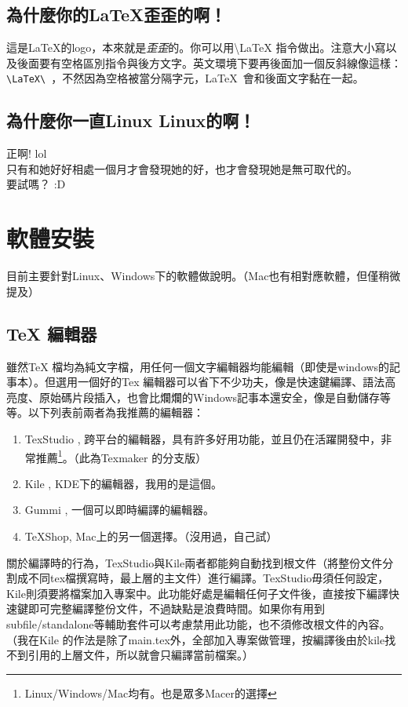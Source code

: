 \documentclass[class=NCU_thesis, crop=false, float=true]{standalone}
\begin{document}
\section{為什麼你的\LaTeX 歪歪的啊！}
這是\LaTeX 的logo，本來就是\textit{歪歪}的。你可以用\textbackslash{}LaTeX 指令做出。注意大小寫以及後面要有空格區別指令與後方文字。英文環境下要再後面加一個反斜線像這樣：\verb*|\LaTeX\ |，不然因為空格被當分隔字元，\LaTeX\ 會和後面文字黏在一起。

\section{為什麼你一直Linux Linux的啊！}
正啊! lol \\
只有和她好好相處一個月才會發現她的好，也才會發現她是無可取代的。 \\

\noindent 要試嗎？ :D



\chapter{軟體安裝}
\label{sec:c_install}
目前主要針對Linux、Windows下的軟體做說明。（Mac也有相對應軟體，但僅稍微提及）
\section{TeX 編輯器}
雖然TeX 檔均為純文字檔，用任何一個文字編輯器均能編輯（即使是windows的記事本）。但選用一個好的Tex 編輯器可以省下不少功夫，像是快速鍵編譯、語法高亮度、原始碼片段插入，也會比爛爛的Windows記事本還安全，像是自動儲存等等。以下列表前兩者為我推薦的編輯器：
\begin{enumerate}
    \item TexStudio , 跨平台的編輯器，具有許多好用功能，並且仍在活躍開發中，非常推薦\footnote{Linux/Windows/Mac均有。也是眾多Macer的選擇}。（此為Texmaker 的分支版）
    \item Kile , KDE下的編輯器，我用的是這個。
    \item Gummi , 一個可以即時編譯的編輯器。
    \item TeXShop, Mac上的另一個選擇。（沒用過，自己試） 
\end{enumerate}
關於編譯時的行為，TexStudio與Kile兩者都能夠自動找到根文件（將整份文件分割成不同tex檔撰寫時，最上層的主文件）進行編譯。TexStudio毋須任何設定，Kile則須要將檔案加入專案中。此功能好處是編輯任何子文件後，直接按下編譯快速鍵即可完整編譯整份文件，不過缺點是浪費時間。如果你有用到subfile/standalone等輔助套件可以考慮禁用此功能，也不須修改根文件的內容。（我在Kile 的作法是除了main.tex外，全部加入專案做管理，按編譯後由於kile找不到引用的上層文件，所以就會只編譯當前檔案。）
\end{document}
